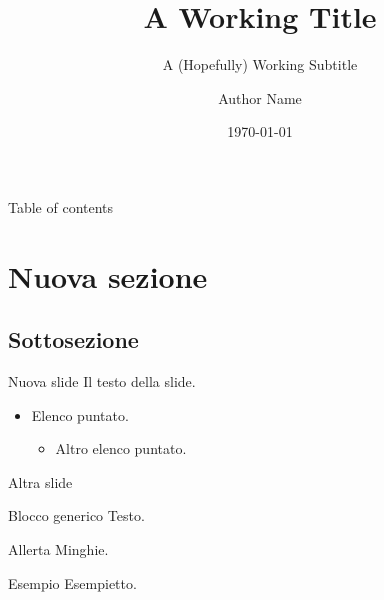 \documentclass{beamer}
\title{A Working Title}
\subtitle{A (Hopefully) Working Subtitle}
\author{Author Name}
\date{\today}
\begin{document}
\begin{frame}
    \maketitle
\end{frame}

\begin{frame}{Table of contents}
    \tableofcontents
\end{frame}

\section{Nuova sezione}
\subsection{Sottosezione}
\begin{frame}{Nuova slide}
    Il testo della slide.
    \begin{itemize}
        \item Elenco puntato.
        \begin{itemize}
            \item Altro elenco puntato.
        \end{itemize}
    \end{itemize}
\end{frame}

\begin{frame}{Altra slide}
    \begin{block}{Blocco generico}
    Testo.
    \end{block}

    \begin{alertblock}{Allerta}
        Minghie.
    \end{alertblock}

    \begin{exampleblock}{Esempio}
        Esempietto.
    \end{exampleblock}
\end{frame}
\end{document}
